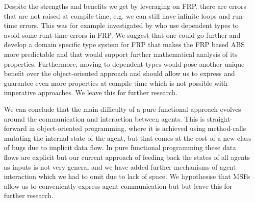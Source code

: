 Despite the strengths and benefits we get by leveraging on FRP, there are errors that are not raised at compile-time, e.g. we can still have infinite loops and run-time errors. This was for example investigated by \cite{sculthorpe_safe_2009} who use dependent types to avoid some runt-time errors in FRP. We suggest that one could go further and develop a domain specific type system for FRP that makes the FRP based ABS more predictable and that would support further mathematical analysis of its properties. Furthermore, moving to dependent types would pose another unique benefit over the object-oriented approach and should allow us to express and guarantee even more properties at compile time which is not possible with imperative approaches. We leave this for further research.

We can conclude that the main difficulty of a pure functional approach evolves around the communication and interaction between agents. This is straight-forward in object-oriented programming, where it is achieved using method-calls mutating the internal state of the agent, but that comes at the cost of a new class of bugs due to implicit data flow. In pure functional programming these data flows are explicit but our current approach of feeding back the states of all agents as inputs is not very general and we have added further mechanisms of agent interaction which we had to omit due to lack of space. We hypothesise that MSFs allow us to conveniently express agent communication but but leave this for further research.

